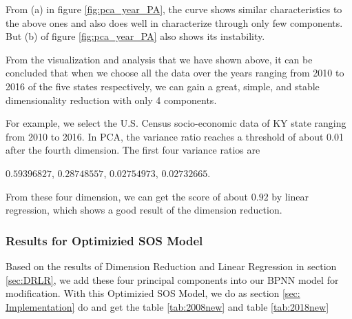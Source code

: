 \documentclass{mcmthesis}
\begin{document}
From (a) in figure \ref{fig:pca_year_PA}, the curve shows similar characteristics to the above ones and also does well in characterize through only few components. But (b) of figure \ref{fig:pca_year_PA} also shows its instability.

From the visualization and analysis that we have shown above, it can be concluded that when we choose all the data over the years ranging from 2010 to 2016 of the five states respectively, we can gain a great, simple, and stable dimensionality reduction with only 4 components.

For example, we select the U.S. Census socio-economic data of KY state ranging from 2010 to 2016. In PCA, the variance ratio reaches a threshold of about 0.01 after the fourth dimension. The first four variance ratios are 
\begin{center}
    $0.59396827$, $0.28748557$, $0.02754973$, $0.02732665$.
\end{center}

From these four dimension, we can get the score of about $0.92$ by linear regression, which shows a good result of the dimension reduction. 

\subsubsection{Results for Optimizied SOS Model}
Based on the results of Dimension Reduction and Linear Regression in section \ref{sec:DRLR}, we add these four principal components into our BPNN model for modification. With this Optimizied SOS Model, we do as section \ref{sec: Implementation} do and get the table \ref{tab:2008new} and table \ref{tab:2018new}
\end{document}
